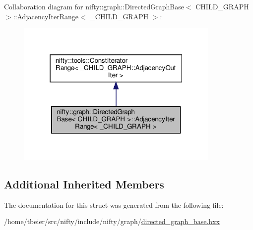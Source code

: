 Collaboration diagram for nifty\+:\+:graph\+:\+:Directed\+Graph\+Base$<$ C\+H\+I\+L\+D\+\_\+\+G\+R\+A\+PH $>$\+:\+:Adjacency\+Iter\+Range$<$ \+\_\+\+C\+H\+I\+L\+D\+\_\+\+G\+R\+A\+PH $>$\+:
\nopagebreak
\begin{figure}[H]
\begin{center}
\leavevmode
\includegraphics[width=279pt]{structnifty_1_1graph_1_1DirectedGraphBase_1_1AdjacencyIterRange__coll__graph}
\end{center}
\end{figure}
\subsection*{Additional Inherited Members}


The documentation for this struct was generated from the following file\+:\begin{DoxyCompactItemize}
\item 
/home/tbeier/src/nifty/include/nifty/graph/\hyperlink{directed__graph__base_8hxx}{directed\+\_\+graph\+\_\+base.\+hxx}\end{DoxyCompactItemize}
